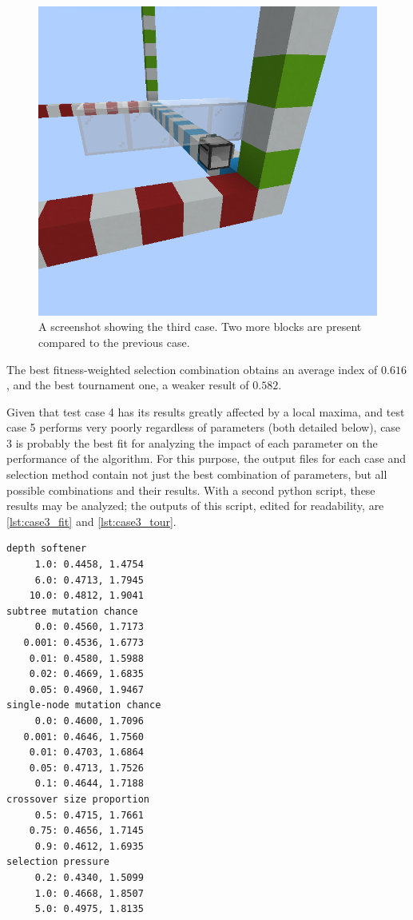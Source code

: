 \documentclass{report}
\newenvironment{code}{\captionsetup{type=listing}}{}
\begin{document}
\begin{figure}[H]
    \centering
    \includegraphics[scale=0.3]{minecraft4}
    \caption{A screenshot showing the third case. Two more blocks are present compared to the previous case.}
\end{figure}

The best fitness-weighted selection combination obtains an average index of $0.616$, and the best tournament one, a weaker result of $0.582$.

Given that test case 4 has its results greatly affected by a local maxima, and test case 5 performs very poorly regardless of parameters (both detailed below), case 3 is probably the best fit for analyzing the impact of each parameter on the performance of the algorithm. For this purpose, the output files for each case and selection method contain not just the best combination of parameters, but all possible combinations and their results. With a second python script, these results may be analyzed; the outputs of this script, edited for readability, are \autoref{lst:case3_fit} and \autoref{lst:case3_tour}.

\begin{code}
    \begin{verbatim}
depth softener
     1.0: 0.4458, 1.4754
     6.0: 0.4713, 1.7945
    10.0: 0.4812, 1.9041
subtree mutation chance
     0.0: 0.4560, 1.7173
   0.001: 0.4536, 1.6773
    0.01: 0.4580, 1.5988
    0.02: 0.4669, 1.6835
    0.05: 0.4960, 1.9467
single-node mutation chance
     0.0: 0.4600, 1.7096
   0.001: 0.4646, 1.7560
    0.01: 0.4703, 1.6864
    0.05: 0.4713, 1.7526
     0.1: 0.4644, 1.7188
crossover size proportion
     0.5: 0.4715, 1.7661
    0.75: 0.4656, 1.7145
     0.9: 0.4612, 1.6935
selection pressure
     0.2: 0.4340, 1.5099
     1.0: 0.4668, 1.8507
     5.0: 0.4975, 1.8135
    \end{verbatim}
    \caption{Average Dice index and depth for each parameter of the fitness-weighted selection runs.}
    \label{lst:case3_fit}
\end{code}
\end{document}
